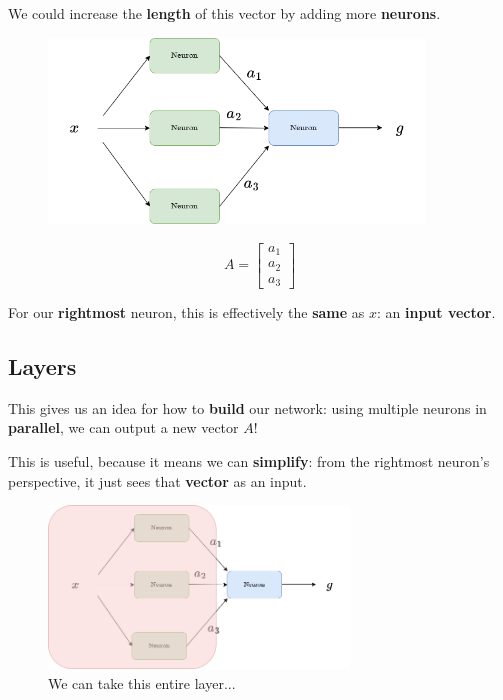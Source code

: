         We could increase the \textbf{length} of this vector by adding more \textbf{neurons}.
        
        \begin{figure}[H]
            \centering
            \includegraphics[width=100mm,scale=0.4]{images/nn_images/three_parallel.png}
        \end{figure}
        
        \begin{equation}
            A = \begin{bmatrix}
              a_1 \\ a_2 \\ a_3
            \end{bmatrix}
        \end{equation}
        
        For our \textbf{rightmost} neuron, this is effectively the \textbf{same} as $x$: an \textbf{input vector}. 
        
    \subsection*{Layers}
        
        This gives us an idea for how to \textbf{build} our network: using multiple neurons in \textbf{parallel}, we can output a new vector $A$! 
        
        This is useful, because it means we can \textbf{simplify}: from the rightmost neuron's perspective, it just sees that \textbf{vector} as an input.
        
        \begin{figure}[H]
            \centering
            \includegraphics[width=80mm,scale=0.4]{images/nn_images/abstracting_A.png}
            \caption*{We can take this entire layer...}
        \end{figure}
        
